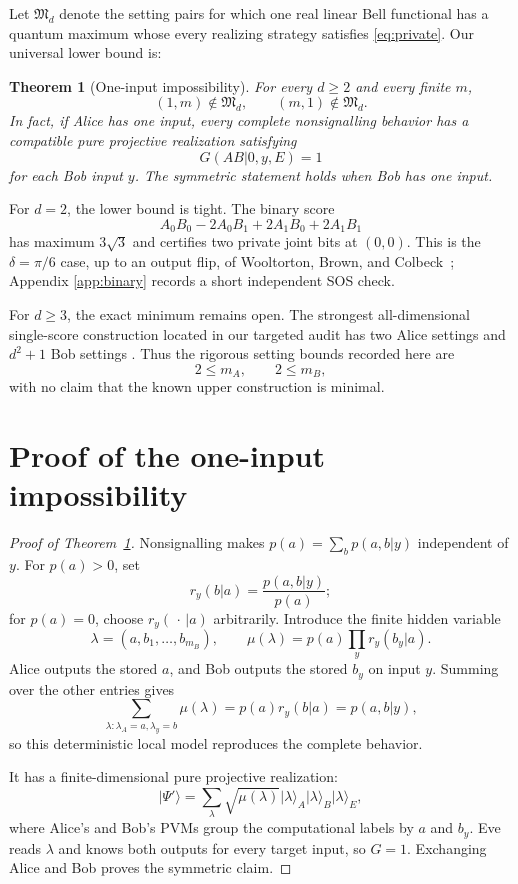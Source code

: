 \documentclass[11pt]{article}
\newtheorem{theorem}{Theorem}[section]
\theoremstyle{remark}
\begin{document}
Let \(\mathfrak M_d\) denote the setting pairs for which one real linear
Bell functional has a quantum maximum whose every realizing strategy
satisfies \eqref{eq:private}.  Our universal lower bound is:

\begin{theorem}[One-input impossibility]\label{thm:oneinput}
For every \(d\geq2\) and every finite \(m\),
\[
(1,m)\notin\mathfrak M_d,
\qquad
(m,1)\notin\mathfrak M_d.
\]
In fact, if Alice has one input, every complete nonsignalling behavior has a
compatible pure projective realization satisfying
\[
G(AB|0,y,E)=1
\]
for each Bob input \(y\).  The symmetric statement holds when Bob has one
input.
\end{theorem}

For \(d=2\), the lower bound is tight.  The binary score
\[
A_0B_0-2A_0B_1+2A_1B_0+2A_1B_1
\]
has maximum \(3\sqrt3\) and certifies two private joint bits at
\((0,0)\).  This is the \(\delta=\pi/6\) case, up to an output flip, of
Wooltorton, Brown, and Colbeck~\cite{WooltortonEtAl2022}; Appendix
\ref{app:binary} records a short independent SOS check.

For \(d\geq3\), the exact minimum remains open.  The strongest
all-dimensional single-score construction located in our targeted audit has
two Alice settings and \(d^2+1\) Bob settings
\cite{FarkasMironowiczAugusiak2026}.  Thus the rigorous setting bounds
recorded here are
\[
2\leq m_A,\qquad 2\leq m_B,
\]
with no claim that the known upper construction is minimal.

\section{Proof of the one-input impossibility}

\begin{proof}[Proof of Theorem~\ref{thm:oneinput}]
Nonsignalling makes
\(p(a)=\sum_b p(a,b|y)\) independent of \(y\).  For \(p(a)>0\), set
\[
r_y(b|a)=\frac{p(a,b|y)}{p(a)};
\]
for \(p(a)=0\), choose \(r_y(\,\cdot\,|a)\) arbitrarily.  Introduce the
finite hidden variable
\[
\lambda=(a,b_1,\ldots,b_{m_B}),\qquad
\mu(\lambda)=p(a)\prod_y r_y(b_y|a).
\]
Alice outputs the stored \(a\), and Bob outputs the stored \(b_y\) on input
\(y\).  Summing over the other entries gives
\[
\sum_{\lambda:\lambda_A=a,\lambda_y=b}\mu(\lambda)
=p(a)r_y(b|a)=p(a,b|y),
\]
so this deterministic local model reproduces the complete behavior.

It has a finite-dimensional pure projective realization:
\[
\lvert\Psi'\rangle
=
\sum_\lambda\sqrt{\mu(\lambda)}
\lvert\lambda\rangle_A\lvert\lambda\rangle_B
\lvert\lambda\rangle_E,
\]
where Alice's and Bob's PVMs group the computational labels by \(a\) and
\(b_y\).  Eve reads \(\lambda\) and knows both outputs for every target
input, so \(G=1\).  Exchanging Alice and Bob proves the symmetric claim.
\end{proof}
\end{document}
